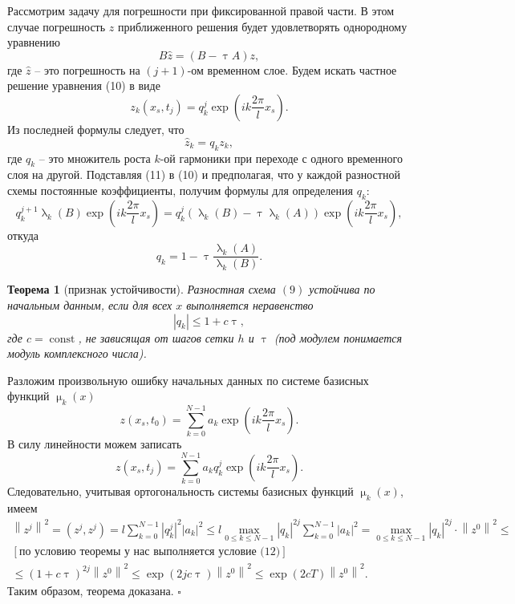 \documentclass[a4paper, 12pt]{report}
\numberwithin{equation}{section}
\newenvironment{Proof} %
{\par\noindent{$\blacklozenge$}} %
{\hfill$\scriptstyle\square$}
\renewcommand{\leq}{\leqslant}
\renewcommand{\tau}{\uptau}
\renewcommand{\lambda}{\uplambda}
\renewcommand{\mu}{\upmu}
\newcommand{\const}{\operatorname{const}}
\newcommand\Norm[1]{\left\| #1 \right\|}
\newtheorem*{theorem}{Теорема}
\begin{document}
		 Рассмотрим задачу для погрешности при фиксированной правой части. В этом случае погрешность $z$ приближенного решения будет удовлетворять однородному уравнению
		 \begin{equation}
		 	B \hat z = (B - \tau A)z,
		 \end{equation} 
		 где $\hat z$ -- это погрешность на $(j+1)$-ом временном слое. Будем искать частное решение уравнения (10) в виде
		 \begin{equation}
		 	z_k(x_s, t_j) = q_k^j \exp \left(ik \frac {2\pi}lx_s\right).
		 \end{equation}
		 Из последней формулы следует, что
		 $$\hat z_k = q_kz_k,$$
		 где $q_k$ -- это множитель роста $k$-ой гармоники при переходе с одного временного слоя на другой. Подставляя (11) в (10) и предполагая, что у каждой разностной схемы постоянные коэффициенты, получим формулы для определения $q_k$:
		 $$q_k^{j+1}\lambda _k(B)  \exp \left(ik \frac {2\pi}lx_s\right) = q_k^j (\lambda _k (B) - \tau \lambda_k (A)) \exp \left(ik \frac {2\pi}lx_s\right),$$
		 откуда
		 $$q_k = 1 - \tau \dfrac{\lambda _k( A)}{\lambda_k (B)}.$$
		 \begin{theorem}
		 	[признак устойчивости]
		 	Разностная схема $(9)$ устойчива по начальным данным, если для всех $x$ выполняется неравенство
		 	\begin{equation}
		 		|q_k| \leq 1 + c\tau,
		 	\end{equation}
		 	где $c = \const$, не зависящая от шагов сетки $h$ и $\tau$
		 	(под модулем понимается модуль комплексного числа).
		 \end{theorem}
		 \begin{Proof}
		 	Разложим произвольную ошибку начальных данных по системе базисных функций $\mu_k(x)$
		 	$$z(x_s, t_0) = \sum_{k=0}^{N-1}a_k \exp \left(ik \frac {2\pi}lx_s\right).$$
		 	В силу линейности можем записать
		 	$$z(x_s, t_j) = \sum_{k=0}^{N-1}a_kq_k^j \exp \left(ik \frac {2\pi}lx_s\right).$$
		 	Следовательно, учитывая ортогональность системы базисных функций $\mu_k(x)$, имеем
		 	\begin{multline*}
		 		\Norm{z^j}^2 = (z^j, z^j) = l \sum_{k=0}^{N-1} |q_k^j|^2 |a_k|^2 \leq l \underset{0 \leq k \leq N-1}{\max} |q_k|^{2j} \sum_{k=0}^{N-1} |a_k|^2 =\underset{0 \leq k \leq N-1}{\max} |q_k|^{2j} \cdot \Norm{z^0}^2\leq \\
		 		[\text{по условию теоремы у нас выполняется условие (12)}]\\ \leq (1+c\tau)^{2j}\Norm{z^0}^2\leq \exp (2j c \tau)\Norm{z^0}^2 \leq \exp(2 c T)\Norm{z^0}^2.
		 	\end{multline*}
		 Таким образом, теорема доказана.
		 \end{Proof}\\\\
\end{document}
